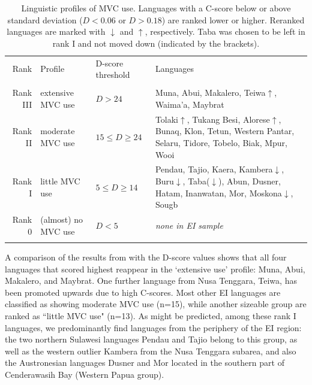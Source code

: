 \begin{table}
\begin{footnotesize}
\begin{tabular}{r l l p{5cm} }
\lsptoprule
Rank & Profile & D-score threshold & Languages \\
 \\ 
\hline
 Rank III & extensive MVC use & $D > 24 $ & Muna, Abui, Makalero, Teiwa$\uparrow$, Waima'a, Maybrat \\ 
\hline 
Rank II & moderate MVC use & $  15 \leq D \geq 24 $ & Tolaki$\uparrow$, Tukang Besi, Alorese$\uparrow$, Bunaq, Klon, Tetun, Western Pantar, Selaru, Tidore, Tobelo, Biak, Mpur, Wooi \\
\hline
Rank I & little MVC use & $ 5 \leq D \geq 14 $  & Pendau, Tajio, Kaera, Kambera$\downarrow$, Buru$\downarrow$, Taba($\downarrow$), Abun, Dusner, Hatam, Inanwatan, Mor, Moskona$\downarrow$, Sougb \\
\hline 
Rank 0 & (almost) no MVC use & $ D < 5 $ & \textit{none in EI sample} \\    
\lspbottomrule 
\end{tabular}
\end{footnotesize}
\caption[Linguistic profiles of MVC use]{Linguistic profiles of MVC use. Languages with a C-score below or above standard deviation ($D < 0.06$ or $D > 0.18$) are ranked lower or higher. Reranked languages are marked with $\downarrow$ and $\uparrow$, respectively. Taba was chosen to be left in rank I and not moved down (indicated by the brackets).}
\label{table:profile_MVCuse} 
\end{table}

A comparison of the results from  with the D-score values shows that all four languages that scored highest reappear in the `extensive use' profile: Muna, Abui, Makalero, and Maybrat. One further language from Nusa Tenggara, Teiwa, has been promoted upwards due to high C-scores. Most other EI languages are classified as showing moderate MVC use (n=15), while another sizeable group are ranked as ``little MVC use" (n=13). As might be predicted, among these rank I languages, we predominantly find languages from the periphery of the EI region: the two northern Sulawesi languages Pendau and Tajio belong to this group, as well as the western outlier Kambera from the Nusa Tenggara subarea, and also the Austronesian languages Dusner and Mor located in the southern part of Cenderawasih Bay (Western Papua group). 

